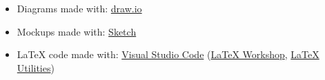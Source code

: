 \begin{itemize}
    \item Diagrams made with: \href{http://www.draw.io}{draw.io}
    \item Mockups made with: \href{https://www.sketch.com/}{Sketch}
    \item LaTeX code made with: \href{https://code.visualstudio.com/}{Visual Studio Code} (\href{https://marketplace.visualstudio.com/items?itemName=James-Yu.latex-workshop}{LaTeX Workshop}, \href{https://marketplace.visualstudio.com/items?itemName=tecosaur.latex-utilities}{LaTeX Utilities})
\end{itemize}